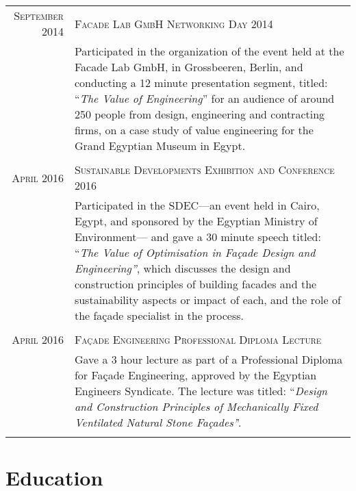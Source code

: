 \documentclass[a4paper,11pt]{article} %
\begin{document}
\begin{tabular}{r|p{11cm}}
\textsc{September 2014} & \textsc{Facade Lab GmbH Networking Day 2014}\\ 
& \footnotesize{Participated in the organization of the event held at the Facade Lab GmbH, in Grossbeeren, Berlin, and conducting a 12 minute presentation segment, titled: ``\emph{The Value of Engineering}'' for an audience of around 250 people from design, engineering and contracting firms, on a case study of value engineering for the Grand Egyptian Museum in Egypt.}\\
\multicolumn{2}{c}{} \\

\textsc{April 2016} & \textsc{Sustainable Developments Exhibition and Conference 2016}\\ 
& \footnotesize{Participated in the SDEC---an event held in Cairo, Egypt, and sponsored by the Egyptian Ministry of Environment--- and gave a 30 minute speech titled: ``\emph{The Value of Optimisation in Fa\c{c}ade Design and Engineering''}, which discusses the design and construction principles of building facades and the sustainability aspects or impact of each, and the role of the fa\c{c}ade specialist in the process.}\\
\multicolumn{2}{c}{} \\

\textsc{April 2016} & \textsc{Fa\c{c}ade Engineering Professional Diploma Lecture}\\ 
& \footnotesize{Gave a 3 hour lecture as part of a Professional Diploma for Fa\c{c}ade Engineering, approved by the Egyptian Engineers Syndicate. The lecture was titled: ``\emph{Design and Construction Principles of Mechanically Fixed Ventilated Natural Stone Fa\c{c}ades'}'.}\\
\multicolumn{2}{c}{} \\

\end{tabular}


\section{Education}
\end{document}
